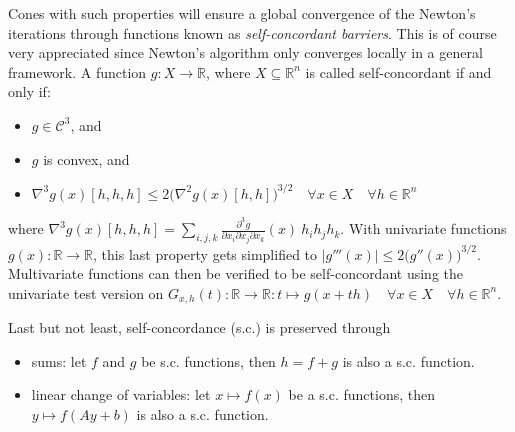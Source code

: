 \documentclass[11 pt]{report}
\begin{document}
Cones with such properties will ensure a global convergence of the Newton's iterations through functions known as \textit{self-concordant barriers}. This is of course very appreciated since Newton's algorithm only converges locally in a general framework.
A function $g:X\to\mathbb{R}$, where $X\subseteq \mathbb{R}^n$ is called self-concordant if and only if:
\begin{itemize}[label=--]
    \item $g \in \mathcal{C}^3$, and
    \item $g$ is convex, and
    \item $\nabla^3 g(x) [h, h, h] \leq 2 \big(\nabla^2 g(x) [h, h]\big)^{3/2} \quad \forall x \in X \quad \forall h \in \mathbb{R}^n$
\end{itemize}
where $\nabla^3 g(x) [h, h, h] = \sum_{i, j, k} \frac{\partial^3 g}{\partial x_i \partial x_j \partial x_k}(x)\: h_i h_j h_k$. With univariate functions $g(x) : \mathbb{R} \to \mathbb{R}$, this last property gets simplified to $|g'''(x)| \leq 2 \big( g''(x) \big)^{3/2}$. Multivariate functions can then be verified to be self-concordant using the univariate test version on $G_{x,h}(t) : \mathbb{R} \to \mathbb{R} : t \mapsto g(x + th) \quad \forall x \in X \quad \forall h \in \mathbb{R}^n$.

Last but not least, self-concordance (s.c.) is preserved through
\begin{itemize}[label=--]
    \item sums: let $f$ and $g$ be s.c. functions, then $h = f+g$ is also a s.c. function.
    \item linear change of variables: let $x \mapsto f(x)$ be a s.c. functions, then $y \mapsto f(A y + b)$ is also a s.c. function.
\end{itemize}
\end{document}

